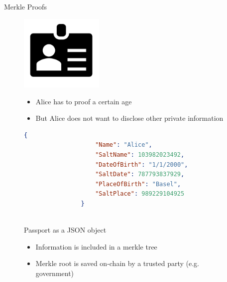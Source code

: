 \documentclass[]{beamer}
\begin{document}

\begin{frame}[fragile]{Merkle Proofs}
	\begin{figure}
		\begin{minipage}[h]{0.55\linewidth}
			\centering
			\includegraphics[width=4cm]{../assets/images/id.PNG}
		\end{minipage}%
		\hfill
		\begin{minipage}[h]{0.45\linewidth}
			\begin{itemize}
				\item<1 ->Alice has to proof a certain age
				\item<1 ->But Alice does not want to disclose other private information
			\end{itemize}
		\end{minipage}
	\end{figure}
	\vspace{-0.5cm}
	\begin{figure}
		\begin{minipage}[h]{0.55\linewidth}
			\hspace{-0.5cm}
			\begin{adjustbox}{width = 0.8\linewidth}
			\begin{lstlisting}[language=json,firstnumber=1]
				{
					"Name": "Alice",
					"SaltName": 103982023492,
					"DateOfBirth": "1/1/2000",
					"SaltDate": 787793837929,
					"PlaceOfBirth": "Basel",
					"SaltPlace": 989229104925
				}
			\end{lstlisting}
			\end{adjustbox}
			\centering
			\\[0.1cm] \scriptsize{Passport as a JSON object}
		\end{minipage}%
		\hfill
		\begin{minipage}[h]{0.45\linewidth}
			\begin{itemize}
				\item<2 ->Information is included in a merkle tree
				\item<2 ->Merkle root is saved on-chain by a trusted party (e.g. government)
			\end{itemize}
		\end{minipage}
	\end{figure}
\end{frame}
\end{document}
